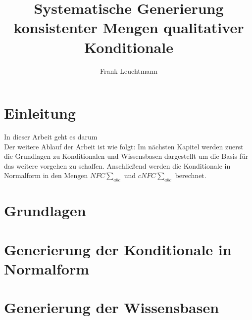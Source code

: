 \documentclass[12pt,a4paper]{article}
\author{Frank Leuchtmann}
\title{Systematische Generierung konsistenter Mengen qualitativer
Konditionale}
\begin{document}
\maketitle
\newpage
\tableofcontents
\newpage
\section{Einleitung}
In dieser Arbeit geht es darum
\\
Der weitere Ablauf der Arbeit ist wie folgt: Im nächsten Kapitel werden zuerst die Grundlagen zu Konditionalen und Wissensbasen dargestellt um die Basis für das weitere vorgehen zu schaffen. Anschließend werden die Konditionale in Normalform in den Mengen $NFC\sum_{abc}$ und $cNFC\sum_{abc}$ berechnet.
\section{Grundlagen}
\cite{beierle17}
\section{Generierung der Konditionale in Normalform}
\section{Generierung der Wissensbasen}


 
\end{document}
